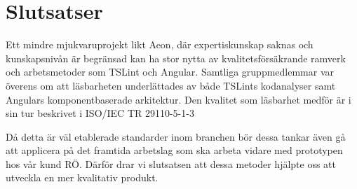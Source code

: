 \section{Slutsatser}

Ett mindre mjukvaruprojekt likt Aeon, där expertiskunskap saknas och kunskapsnivån är begränsad kan ha stor nytta av kvalitetsförsäkrande ramverk och arbetsmetoder som TSLint och Angular. 
Samtliga gruppmedlemmar var överens om att läsbarheten underlättades av både TSLints kodanalyser samt Angulars komponentbaserade arkitektur.
Den kvalitet som läsbarhet medför är i sin tur beskrivet i ISO/IEC TR 29110-5-1-3

Då detta är väl etablerade standarder inom branchen bör dessa tankar även gå att applicera på det framtida arbetslag som ska arbeta vidare med prototypen hos vår kund RÖ. Därför drar vi slutsatsen att dessa metoder hjälpte oss att utveckla en mer kvalitativ produkt.

